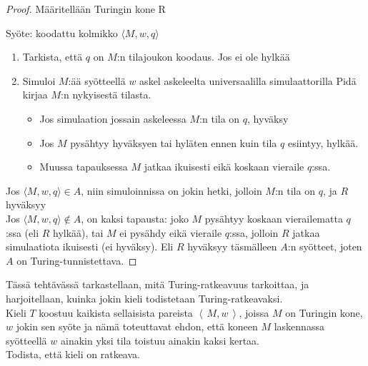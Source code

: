 \documentclass[12pt,a4paper]{article}
\newcommand{\code}[1]{\left\langle\,#1\,\right\rangle}
\begin{document}
\bigskip


    
\begin{proof}
Määritellään Turingin kone R

\medskip
\noindent Syöte: koodattu kolmikko $\langle M,w,q\rangle$

\begin{enumerate}
\item Tarkista, että $q$ on $M$:n tilajoukon koodaus. Jos ei ole hylkää
\item Simuloi $M$:ää syötteellä $w$ askel askeleelta universaalilla simulaattorilla
      Pidä kirjaa $M$:n nykyisestä tilasta.
      \begin{itemize}
        \item Jos simulaation jossain askeleessa $M$:n tila on $q$, hyväksy
        \item Jos $M$ pysähtyy hyväksyen tai hyläten ennen kuin tila $q$ esiintyy, hylkää.
        \item Muussa tapauksessa  $M$ jatkaa ikuisesti eikä koskaan vieraile $q$:ssa.
      \end{itemize}
\end{enumerate}

\noindent  
Jos $\langle M,w,q\rangle\in A$, niin simuloinnissa on jokin hetki,
jolloin $M$:n tila on $q$, ja $R$ hyväksyy\\

Jos $\langle M,w,q\rangle\notin A$, on kaksi tapausta: joko $M$ 
pysähtyy koskaan vierailematta $q$:ssa (eli $R$ hylkää), 
tai $M$ ei pysähdy eikä vieraile $q$:ssa, jolloin $R$ jatkaa 
simulaatiota ikuisesti (ei hyväksy). Eli $R$ hyväksyy 
täsmälleen $A$:n syötteet, joten $A$ on Turing-tunnistettava.
\end{proof}





\pagebreak
{}
Tässä tehtävässä tarkastellaan, mitä Turing-ratkeavuus tarkoittaa, ja harjoitellaan, kuinka jokin kieli todistetaan Turing-ratkeavaksi.\\

Kieli $T$ koostuu kaikista sellaisista pareista $\code{M,w}$,
joissa $M$ on Turingin kone, $w$ jokin sen syöte
ja nämä toteuttavat ehdon, että koneen $M$ laskennassa
syötteellä $w$ ainakin yksi tila toistuu ainakin kaksi kertaa.\\

Todista, että kieli on ratkeava.\\
\end{document}
